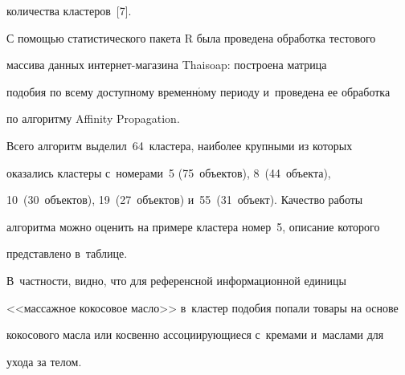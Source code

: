 количества кластеров~[7].


  


  С помощью статистического пакета R была проведена обработка тестового 


массива данных ин\-тер\-нет-ма\-га\-зи\-на Thaisoap: построена матрица 


подобия по всему доступному временн$\acute{\mbox{о}}$му периоду и~проведена ее обработка 


по алгоритму Affinity Propagation.


  


  Всего алгоритм выделил~64~кластера, наиболее крупными из которых 


оказались кластеры с~номерами~5 (75~объектов), 8~(44~объекта), 


10~(30~объектов), 19~(27~объектов) и~55~(31~объект). Качество работы 


алгоритма можно оценить на примере кластера номер~5, описание которого 


представлено в~таблице. 


%  


  В~частности, видно, что для референсной информационной единицы 


<<массажное кокосовое масло>> в~кластер подобия попали товары на основе 


кокосового масла или косвенно ассоциирующиеся с~кремами и~маслами для 


ухода за телом.


  


